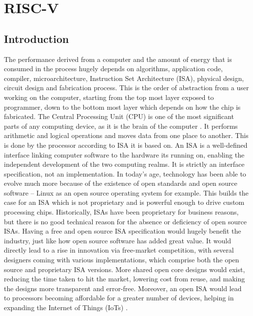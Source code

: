 \chapter{RISC-V}
\label{ch6_riscv}

\section{Introduction}
 \label{sect6_1}
 
The performance derived from a computer and the amount of energy that is consumed in the process hugely depends on algorithms, application code, compiler, microarchitecture, Instruction Set Architecture (ISA), physical design, circuit design and fabrication process. This is the order of abstraction from a user working on the computer, starting from the top most layer exposed to programmer, down to the bottom most layer which depends on how the chip is fabricated. \newline\newline
The Central Processing Unit (CPU) is one of the most significant parts of any computing device, as it is the brain of the computer \cite{riscv_xda}. It performs arithmetic and logical operations and moves data from one place to another. This is done by the processor according to ISA it is based on. An ISA is a well-defined interface linking computer software to the hardware its running on, enabling the independent development of the two computing realms. It is strictly an interface specification, not an implementation. \newline\newline
In today's age, technology has been able to evolve much more because of the existence of open standards and open source software – Linux as an open source operating system for example. This builds the case for an ISA which is not proprietary and is powerful enough to drive custom processing chips. \newline\newline
Historically, ISAs have been proprietary for business reasons, but there is no good technical reason for the absence or deficiency of open source ISAs. Having a free and open source ISA specification would hugely benefit the industry, just like how open source software has added great value. It would directly lead to a rise in innovation via free-market competition, with several designers coming with various implementations, which comprise both the open source and proprietary ISA versions. More shared open core designs would exist, reducing the time taken to hit the market, lowering cost from reuse, and making the designs more transparent and error-free. Moreover, an open ISA would lead to processors becoming affordable for a greater number of devices, helping in expanding the Internet of Things (IoTs) \cite{riscv_isa_free}.

